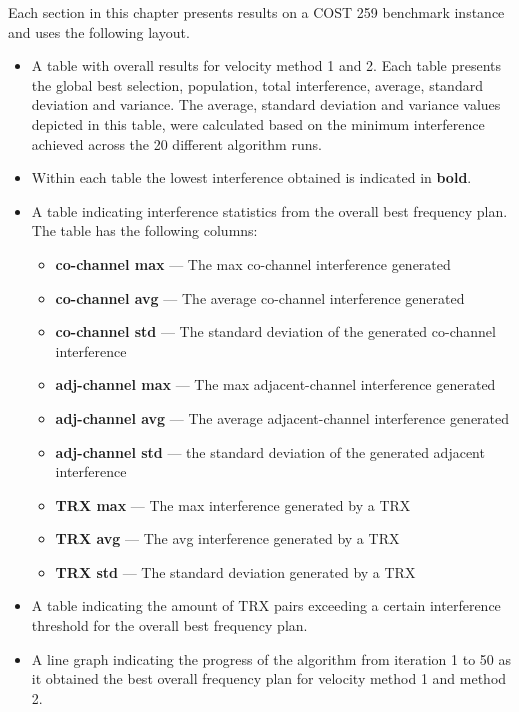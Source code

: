 Each section in this chapter presents results on a \gls{COST} 259 benchmark instance and uses the following layout.
\begin{itemize}
        \item A table with overall results for velocity method 1 and 2. Each table presents the global best selection, population, total interference, average, standard deviation and variance. The average, standard deviation and variance values depicted in this table, were calculated based on the minimum interference achieved across the 20 different algorithm runs.
        \item Within each table the lowest interference obtained is indicated in \textbf{bold}.
        \item A table indicating interference statistics from the overall best frequency plan. The table has the following columns:
            \begin{itemize}
                \item{\textbf{co-channel max}} --- The max co-channel interference generated
                \item{\textbf{co-channel avg}} --- The average co-channel interference generated
                \item{\textbf{co-channel std}} --- The standard deviation of the generated co-channel interference
                \item{\textbf{adj-channel max}} --- The max adjacent-channel interference generated
                \item{\textbf{adj-channel avg}} --- The average adjacent-channel interference generated
                \item{\textbf{adj-channel std}} --- the standard deviation of the generated adjacent interference
                \item{\textbf{TRX max}} --- The max interference generated by a TRX
                \item{\textbf{TRX avg}} --- The avg interference generated by a TRX
                \item{\textbf{TRX std}} --- The standard deviation generated by a TRX
            \end{itemize}
        \item A table indicating the amount of TRX pairs exceeding a certain interference threshold for the overall best frequency plan.
        \item A line graph indicating the progress of the algorithm from iteration 1 to 50 as it obtained the best overall frequency plan for velocity method 1 and method 2.
\end{itemize}


